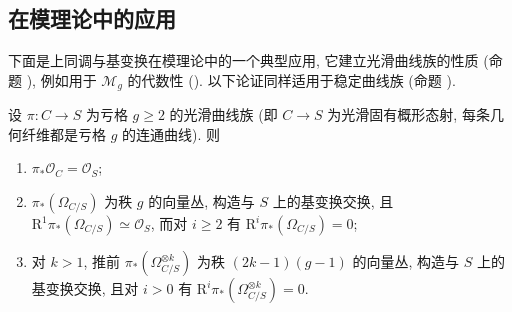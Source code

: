 \subsection{在模理论中的应用}\label{src:A.6.2-subsection}
下面是上同调与基变换在模理论中的一个典型应用, 它建立光滑曲线族的性质 (命题 ), 例如用于 $\mathcal M_g$ 的代数性 (). 以下论证同样适用于稳定曲线族 (命题 ).
\begin{proposition}\label{src:A.6.11}
设 $\pi:C\to S$ 为亏格 $g\geq2$ 的光滑曲线族 (即 $C\to S$ 为光滑固有概形态射, 每条几何纤维都是亏格 $g$ 的连通曲线). 则
\begin{enumerate}[(1)]
\item $\pi_*\mathcal O_C=\mathcal O_S$;
\item $\pi_*(\Omega_{C/S})$ 为秩 $g$ 的向量丛, 构造与 $S$ 上的基变换交换, 且 $\mathrm R^1\pi_*(\Omega_{C/S})\simeq\mathcal O_S$, 而对 $i\geq2$ 有 $\mathrm R^i\pi_*(\Omega_{C/S})=0$;
\item 对 $k>1$, 推前 $\pi_*(\Omega_{C/S}^{\otimes k})$ 为秩 $(2k-1)(g-1)$ 的向量丛, 构造与 $S$ 上的基变换交换, 且对 $i>0$ 有 $\mathrm R^i\pi_*(\Omega_{C/S}^{\otimes k})=0$.
\end{enumerate}
\end{proposition}
